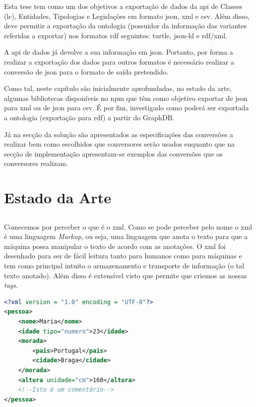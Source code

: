 Esta tese tem como um dos objetivos a exportação de dados da \acrshort{api} de Classes (\acrshort{lc}), Entidades, Tipologias e Legislações em formato \acrshort{json}, \acrshort{xml} e \acrshort{csv}. Além disso, deve permitir a exportação da ontologia (possuidor da informação das variantes referidas a exportar) nos formatos \acrshort{rdf} seguintes: \acrshort{turtle}, \acrshort{json-ld} e \acrshort{rdf}/\acrshort{xml}.

A \acrshort{api} de dados já devolve a sua informação em \acrshort{json}. Portanto, por forma a realizar a exportação dos dados para outros formatos é necessário realizar a conversão de \acrshort{json} para o formato de saída pretendido.

Como tal, neste capítulo são inicialmente aprofundadas, no estado da arte, algumas bibliotecas disponíveis no \acrshort{npm} que têm como objetivo exportar de \acrshort{json} para \acrshort{xml} ou de \acrshort{json} para \acrshort{csv}. É por fim, investigado como poderá ser exportada a ontologia (exportação para \acrshort{rdf}) a partir do GraphDB.

Já na secção da solução são apresentados as especificações das conversões a realizar bem como escolhidos que conversores serão usados enquanto que na secção de implementação apresentam-se exemplos das conversões que os conversores realizam.

\section{Estado da Arte}\label{sec:exportacao}

\subsection{}

Comecemos por perceber o que é o \acrfull{xml}. Como se pode perceber pelo nome o \acrshort{xml} é uma linguagem \textit{Markup}, ou seja, uma linguagem que anota o texto para que a máquina possa manipular o texto de acordo com as anotações. O \acrshort{xml} foi desenhado para ser de fácil leitura tanto para humanos como para máquinas e tem como principal intuito o armazenamento e transporte de informação (o tal texto anotado). Além disso é extensível visto que permite que criemos as nossas \textit{tags}.

\begin{lstlisting}[language=xml, caption=Pequeno exemplo em \acrshort{xml}, label=exem:xmlEx]
<?xml version = "1.0" encoding = "UTF-8"?>
<pessoa>
    <nome>Maria</nome>
    <idade tipo="numero">23</idade>
    <morada>
        <pais>Portugal</pais>
        <cidade>Braga</cidade>
    </morada>
    <altura unidade="cm">160</altura>
    <!--Isto é um comentário-->
</pessoa>
\end{lstlisting}

